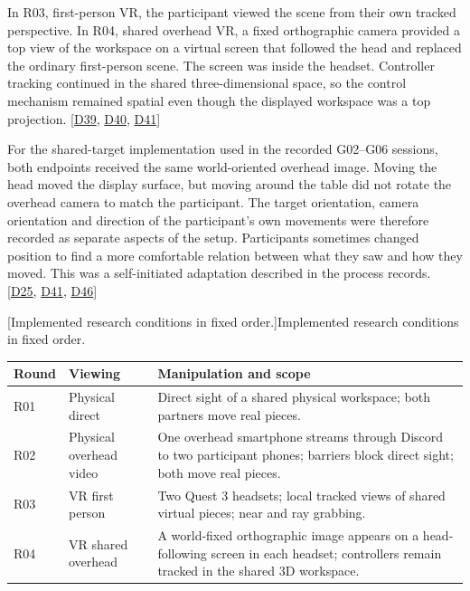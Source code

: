 In R03, first-person VR, the participant viewed the scene from their own tracked perspective. In R04, shared overhead VR, a fixed orthographic camera provided a top view of the workspace on a virtual screen that followed the head and replaced the ordinary first-person scene. The screen was inside the headset. Controller tracking continued in the shared three-dimensional space, so the control mechanism remained spatial even though the displayed workspace was a top projection. [\hyperlink{src:D39}{D39}, \hyperlink{src:D40}{D40}, \hyperlink{src:D41}{D41}]

For the shared-target implementation used in the recorded G02--G06 sessions, both endpoints received the same world-oriented overhead image. Moving the head moved the display surface, but moving around the table did not rotate the overhead camera to match the participant. The target orientation, camera orientation and direction of the participant's own movements were therefore recorded as separate aspects of the setup. Participants sometimes changed position to find a more comfortable relation between what they saw and how they moved. This was a self-initiated adaptation described in the process records. [\hyperlink{src:D25}{D25}, \hyperlink{src:D41}{D41}, \hyperlink{src:D46}{D46}]

\par\addvspace{8pt}
\noindent\begin{minipage}{\linewidth}
\begingroup
\centering
{}
\fontsize{10}{12.3}\selectfont
\setlength{\tabcolsep}{2.2pt}
\renewcommand{\arraystretch}{1.18}
[Implemented research conditions in fixed order.]{Implemented research conditions in fixed order.}\label{tab:3-1}
\begin{tabular}{@{}>{\raggedright\arraybackslash}p{13.729mm}>{\raggedright\arraybackslash}p{42.169mm}>{\raggedright\arraybackslash}p{101.009mm}@{}}
\toprule
\textbf{Round} & \textbf{Viewing} & \textbf{Manipulation and scope} \\
\midrule
R01 & Physical direct & Direct sight of a shared physical workspace; both partners move real pieces. \\
\addlinespace[3pt]
R02 & Physical overhead video & One overhead smartphone streams through Discord to two participant phones; barriers block direct sight; both move real pieces. \\
\addlinespace[3pt]
R03 & VR first person & Two Quest 3 headsets; local tracked views of shared virtual pieces; near and ray grabbing. \\
\addlinespace[3pt]
R04 & VR shared overhead & A world-fixed orthographic image appears on a head-following screen in each headset; controllers remain tracked in the shared 3D workspace. \\
\bottomrule
\end{tabular}
\par\endgroup
\end{minipage}\par\addvspace{8pt}




